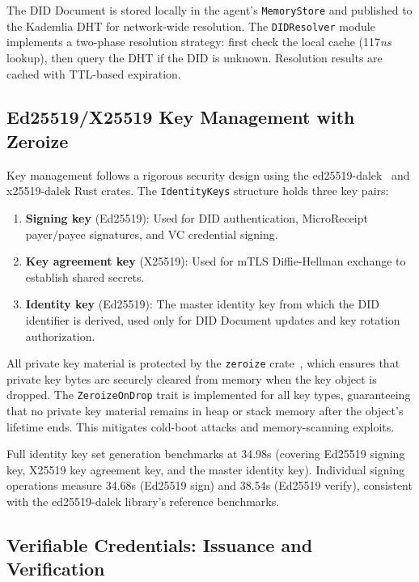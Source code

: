 The DID Document is stored locally in the agent's \texttt{MemoryStore} and published to the Kademlia DHT for network-wide resolution. The \texttt{DIDResolver} module implements a two-phase resolution strategy: first check the local cache (117\textit{ns} lookup), then query the DHT if the DID is unknown. Resolution results are cached with TTL-based expiration.

\subsection{Ed25519/X25519 Key Management with Zeroize}

Key management follows a rigorous security design using the ed25519-dalek~\cite{ed25519dalek2022} and x25519-dalek Rust crates. The \texttt{IdentityKeys} structure holds three key pairs:

\begin{enumerate}
  \item \textbf{Signing key} (Ed25519): Used for DID authentication, MicroReceipt payer/payee signatures, and VC credential signing.
  \item \textbf{Key agreement key} (X25519): Used for mTLS Diffie-Hellman exchange to establish shared secrets.
  \item \textbf{Identity key} (Ed25519): The master identity key from which the DID identifier is derived, used only for DID Document updates and key rotation authorization.
\end{enumerate}

All private key material is protected by the \texttt{zeroize} crate~\cite{zeroize2022}, which ensures that private key bytes are securely cleared from memory when the key object is dropped. The \texttt{ZeroizeOnDrop} trait is implemented for all key types, guaranteeing that no private key material remains in heap or stack memory after the object's lifetime ends. This mitigates cold-boot attacks and memory-scanning exploits.

Full identity key set generation benchmarks at 34.98\textmu s (covering Ed25519 signing key, X25519 key agreement key, and the master identity key). Individual signing operations measure 34.68\textmu s (Ed25519 sign) and 38.54\textmu s (Ed25519 verify), consistent with the ed25519-dalek library's reference benchmarks.

\subsection{Verifiable Credentials: Issuance and Verification}

